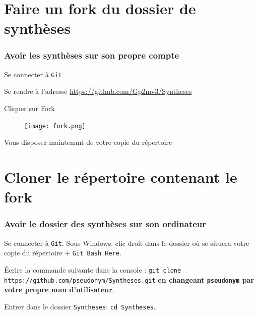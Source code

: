 \documentclass{beamer}
\newenvironment{wideitemize}{\itemize\addtolength{\itemsep}{10pt}}{\enditemize}
\begin{document}
\section{Faire un fork du dossier de synthèses}
\label{fork}

\begin{frame}
	\frametitle{Avoir les synthèses sur son propre compte}
		\begin{wideitemize}
			\item Se connecter à \lstinline|Git|
			\pause
			\item Se rendre à l'adresse
                \url{https://github.com/Gp2mv3/Syntheses}
			\pause
			\item Cliquer sur Fork
                \begin{figure}[H]
                    \centering
                    \texttt{[image: fork.png]}
                \end{figure}
			\pause
			\item Vous disposez maintenant de votre copie du répertoire
		\end{wideitemize}
\end{frame}

\section{Cloner le répertoire contenant le fork}
\label{clone_fork}

\begin{frame}[fragile]
    \frametitle{Avoir le dossier des synthèses sur son ordinateur}
    \begin{wideitemize}
        \item Se connecter à \lstinline|Git|. Sous Windows: clic droit dans le dossier où se situera votre copie du répertoire + \lstinline|Git Bash Here|.
        \pause
        \item Écrire la commande suivante dans la console :
            \lstinline[mathescape]|git clone https://github.com/pseudonym/Syntheses.git| \textbf{en changeant \lstinline|pseudonym| par votre propre nom d'utilisateur}.
        \pause
        \item Entrer dans le dossier \lstinline|Syntheses|: \lstinline[mathescape]|cd Syntheses|.
    \end{wideitemize}
\end{frame}
\end{document}
